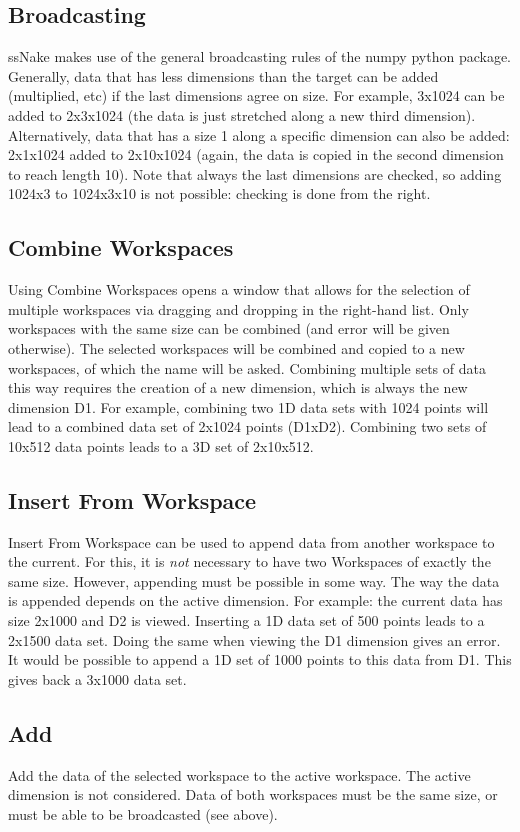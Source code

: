 \documentclass[11pt,a4paper]{article}
\begin{document}
\subsection{Broadcasting}
ssNake makes use of the general broadcasting rules of the numpy python package. Generally, data that has less dimensions than the target can be added (multiplied, etc)
if the last dimensions agree on size. For example, 3x1024 can be added to 2x3x1024 (the data is just stretched along a new third dimension). Alternatively, data that has a size 1
along a specific dimension can also be added: 2x1x1024 added to 2x10x1024 (again, the data is copied in the second dimension to reach length 10).
Note that always the last dimensions are checked, so adding 1024x3 to 1024x3x10 is not possible: checking is done from the right.

\subsection{Combine Workspaces}
Using Combine Workspaces opens a window that allows for the selection of multiple workspaces via dragging and dropping in the right-hand list.
Only workspaces with the same size can be combined (and error will be given otherwise). The selected workspaces will be combined and copied to a new workspaces, of which the name will be asked.
Combining multiple sets of data this way requires the creation of a new dimension, which is always the new dimension D1. For example, combining two 1D data sets with 1024 points will
lead to a combined data set of 2x1024 points (D1xD2). Combining two sets of 10x512 data points leads to a 3D set of 2x10x512.


\subsection{Insert From Workspace}
Insert From Workspace can be used to append data from another workspace to the current. For this, it is \textit{not} necessary to have two Workspaces of exactly the same size.
However, appending must be possible in some way. The way the data is appended depends on the active dimension. For example: the current data has size 2x1000 and D2 is viewed.
Inserting a 1D data set of 500 points leads to a 2x1500 data set. Doing the same when viewing the D1 dimension gives an error. It would be possible to append a 1D set of 1000
points to this data from D1. This gives back a 3x1000 data set.


\subsection{Add}
Add the data of the selected workspace to the active workspace. The active dimension is not considered. Data of both workspaces must be the same size, or must be able to be broadcasted (see above).
\end{document}
